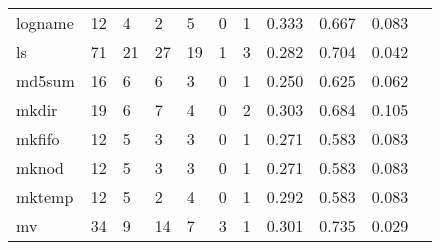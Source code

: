 \begin{longtable}{lp{1.10cm}p{1.10cm}p{1.10cm}p{1.10cm}p{1.10cm}p{1.10cm}p{1.10cm}p{1.10cm}p{1.10cm}p{1.10cm}}
logname   &                     12 &                                  4 &                                 2 &                                5 &                                 0 &                               1 &                          0.333 &                                 0.667 &                               0.083 \\
ls        &                     71 &                                 21 &                                27 &                               19 &                                 1 &                               3 &                          0.282 &                                 0.704 &                               0.042 \\
md5sum    &                     16 &                                  6 &                                 6 &                                3 &                                 0 &                               1 &                          0.250 &                                 0.625 &                               0.062 \\
mkdir     &                     19 &                                  6 &                                 7 &                                4 &                                 0 &                               2 &                          0.303 &                                 0.684 &                               0.105 \\
mkfifo    &                     12 &                                  5 &                                 3 &                                3 &                                 0 &                               1 &                          0.271 &                                 0.583 &                               0.083 \\
mknod     &                     12 &                                  5 &                                 3 &                                3 &                                 0 &                               1 &                          0.271 &                                 0.583 &                               0.083 \\
mktemp    &                     12 &                                  5 &                                 2 &                                4 &                                 0 &                               1 &                          0.292 &                                 0.583 &                               0.083 \\
mv        &                     34 &                                  9 &                                14 &                                7 &                                 3 &                               1 &                          0.301 &                                 0.735 &                               0.029 \\

\end{longtable}

